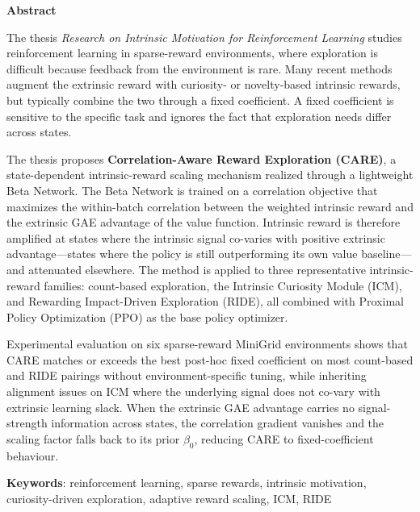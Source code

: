 {}
\begin{center}
\textbf{\large{Abstract}}
\end{center}

\begin{small}
The thesis \textit{Research on Intrinsic Motivation for Reinforcement Learning} studies reinforcement learning in sparse-reward environments, where exploration is difficult because feedback from the environment is rare. Many recent methods augment the extrinsic reward with curiosity- or novelty-based intrinsic rewards, but typically combine the two through a fixed coefficient. A fixed coefficient is sensitive to the specific task and ignores the fact that exploration needs differ across states.

The thesis proposes \textbf{Correlation-Aware Reward Exploration (CARE)}, a state-dependent intrinsic-reward scaling mechanism realized through a lightweight Beta Network. The Beta Network is trained on a correlation objective that maximizes the within-batch correlation between the weighted intrinsic reward and the extrinsic GAE advantage of the value function. Intrinsic reward is therefore amplified at states where the intrinsic signal co-varies with positive extrinsic advantage---states where the policy is still outperforming its own value baseline---and attenuated elsewhere. The method is applied to three representative intrinsic-reward families: count-based exploration, the Intrinsic Curiosity Module (ICM), and Rewarding Impact-Driven Exploration (RIDE), all combined with Proximal Policy Optimization (PPO) as the base policy optimizer.

Experimental evaluation on six sparse-reward MiniGrid environments shows that CARE matches or exceeds the best post-hoc fixed coefficient on most count-based and RIDE pairings without environment-specific tuning, while inheriting alignment issues on ICM where the underlying signal does not co-vary with extrinsic learning slack. When the extrinsic GAE advantage carries no signal-strength information across states, the correlation gradient vanishes and the scaling factor falls back to its prior $\beta_0$, reducing CARE to fixed-coefficient behaviour.

\vspace*{1cm}
\textbf{Keywords}: reinforcement learning, sparse rewards, intrinsic motivation, curiosity-driven exploration, adaptive reward scaling, ICM, RIDE
\end{small}
